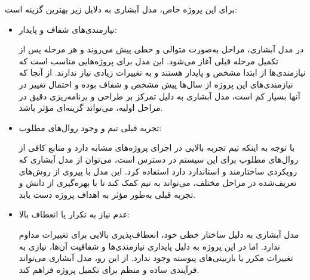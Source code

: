 برای این پروژه خاص، مدل آبشاری به دلایل زیر بهترین گزینه است:
\begin{itemize}
    \item نیازمندی‌های شفاف و پایدار: 
    
    در مدل آبشاری، مراحل به‌صورت متوالی و خطی پیش می‌روند و هر مرحله پس از تکمیل مرحله قبلی آغاز می‌شود. این مدل برای پروژه‌هایی مناسب است که نیازمندی‌ها از ابتدا مشخص و پایدار هستند و به تغییرات زیادی نیاز ندارند. از آنجا که نیازمندی‌های این پروژه از سال‌ها پیش مشخص و شفاف بوده و احتمال تغییر در آنها بسیار کم است، مدل آبشاری به دلیل تمرکز بر طراحی و برنامه‌ریزی دقیق در مراحل اولیه، می‌تواند گزینه‌ای مؤثر باشد.
    \item تجربه قبلی تیم و وجود روال‌های مطلوب:
    
    با توجه به اینکه تیم تجربه بالایی در اجرای پروژه‌های مشابه دارد و منابع کافی از روال‌های مطلوب برای این سیستم در دسترس است، می‌توان از مدل آبشاری که رویکردی ساختارمند و استاندارد دارد استفاده کرد. این مدل با پیروی از روش‌های تعریف‌شده در مراحل مختلف، می‌تواند به تیم کمک کند تا با بهره‌گیری از دانش و تجربه قبلی به‌طور مؤثر به اهداف پروژه دست یابد.
    \item عدم نیاز به تکرار یا انعطاف بالا:
    
    مدل آبشاری به دلیل ساختار خطی خود، انعطاف‌پذیری بالایی برای تغییرات مداوم ندارد. اما در این پروژه به دلیل پایداری نیازمندی‌ها و شفافیت آن‌ها، نیازی به تغییرات مکرر یا بازبینی‌های پیوسته وجود ندارد. از این رو، مدل آبشاری می‌تواند فرآیندی ساده و منظم برای تکمیل پروژه فراهم کند.
\end{itemize}


